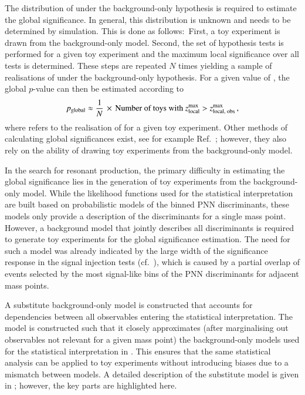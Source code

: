 The distribution of \Zmaxlocal under the background-only hypothesis is required
to estimate the global significance. In general, this distribution is unknown
and needs to be determined by simulation. This is done as follows:~First, a toy
experiment is drawn from the background-only model. Second, the set of
hypothesis tests is performed for a given toy experiment and the maximum local
significance over all tests is determined. These steps are repeated $N$ times
yielding a sample of realisations of \Zmaxlocal under the background-only
hypothesis. For a given value of \zmaxlocalobs, the global $p$-value can then be
estimated according to
\begin{align*}
  p_{\text{global}} \approx \frac{1}{N} \,\times\, \text{Number of toys with } z_{\text{local}}^{\text{max}} > z_{\text{local, obs}}^{\text{max}} \,\text{,}
\end{align*}
where \zmaxlocal refers to the realisation of \Zmaxlocal for a given toy
experiment. Other methods of calculating global significances exist, see for
example Ref.~\cite{Gross:2010qma}; however, they also rely on the ability of
drawing toy experiments from the background-only model.

In the search for resonant \HH production, the primary difficulty in estimating
the global significance lies in the generation of toy experiments from the
background-only model. While the likelihood functions used for the statistical
interpretation are built based on probabilistic models of the binned PNN
discriminants, these models only provide a description of the discriminants for
a single mass point. However, a background model that jointly describes all
discriminants is required to generate toy experiments for the global
significance estimation. The need for such a model was already indicated by the
large width of the significance response in the signal injection tests
(cf.~), which is caused by a partial overlap of
events selected by the most signal-like bins of the PNN discriminants for
adjacent mass points.

A substitute background-only model is constructed that accounts for dependencies
between all observables entering the statistical interpretation. The model is
constructed such that it closely approximates (after marginalising out
observables not relevant for a given mass point) the background-only models used
for the statistical interpretation in . This ensures that
the same statistical analysis can be applied to toy experiments without
introducing biases due to a mismatch between models. A detailed description of
the substitute model is given in ; however, the key
parts are highlighted here.

